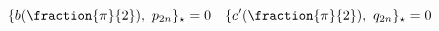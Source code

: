 \begin{equation} \{b(\fraction{\pi}{2}),\ p_{2n}
\}_\star=0\ \ \  \{c'(\fraction{\pi}{2}),\ q_{2n}
\}_\star=0\nonumber
\end{equation} 
